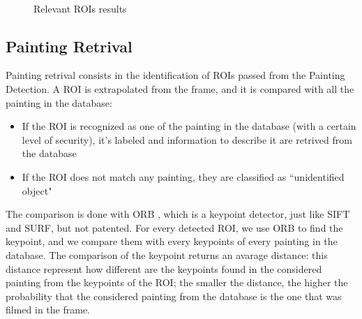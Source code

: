 \documentclass[10pt,twocolumn,letterpaper]{article}
\begin{document}
\begin{figure}
    \\
    \caption{Relevant ROIs results}
    \label{fig:foobar}
\end{figure}

\subsection{Painting Retrival}
Painting retrival consists in the identification of ROIs passed from the Painting Detection. A ROI is extrapolated from the frame, and it is compared with all the painting in the database:
\begin{itemize}
  \item If the ROI is recognized as one of the painting in the database (with a certain level of security), it's labeled and information to describe it are retrived from the database
  \item If the ROI does not match any painting,  they are classified as ``unidentified object"
\end{itemize}
The comparison is done with ORB \cite{orb}, which is a keypoint detector, just like SIFT and SURF, but not patented.
For every detected ROI, we use ORB to find the keypoint, and we compare them with every keypoints of every painting in the database.
The comparison of the keypoint returns an avarage distance: this distance represent how different are the keypoints found in the considered painting from the keypoints of the ROI; the smaller the distance, the higher the probability that the considered painting from the database is the one that was filmed in the frame.
\end{document}
